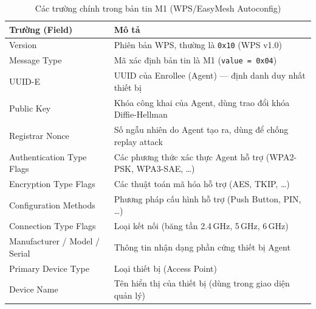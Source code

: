 \begin{table}[ht]
	\centering
	\caption{Các trường chính trong bản tin M1 (WPS/EasyMesh Autoconfig)}
	\begin{tabular}{|>{\raggedright\arraybackslash}m{4cm}|>{\raggedright\arraybackslash}m{9cm}|}
		\hline
		\textbf{Trường (Field)} & \textbf{Mô tả} \\
		\hline
		Version & Phiên bản WPS, thường là \texttt{0x10} (WPS v1.0) \\
		\hline
		Message Type & Mã xác định bản tin là M1 (\texttt{value = 0x04}) \\
		\hline
		UUID-E & UUID của Enrollee (Agent) --- định danh duy nhất thiết bị \\
		\hline
		Public Key & Khóa công khai của Agent, dùng trao đổi khóa Diffie-Hellman \\
		\hline
		Registrar Nonce & Số ngẫu nhiên do Agent tạo ra, dùng để chống replay attack \\
		\hline
		Authentication Type Flags & Các phương thức xác thực Agent hỗ trợ (WPA2-PSK, WPA3-SAE, \ldots) \\
		\hline
		Encryption Type Flags & Các thuật toán mã hóa hỗ trợ (AES, TKIP, \ldots) \\
		\hline
		Configuration Methods & Phương pháp cấu hình hỗ trợ (Push Button, PIN, \ldots) \\
		\hline
		Connection Type Flags & Loại kết nối (băng tần 2.4\,GHz, 5\,GHz, 6\,GHz) \\
		\hline
		Manufacturer / Model / Serial & Thông tin nhận dạng phần cứng thiết bị Agent \\
		\hline
		Primary Device Type & Loại thiết bị (Access Point) \\
		\hline
		Device Name & Tên hiển thị của thiết bị (dùng trong giao diện quản lý) \\
		\hline
	\end{tabular}
\end{table}

